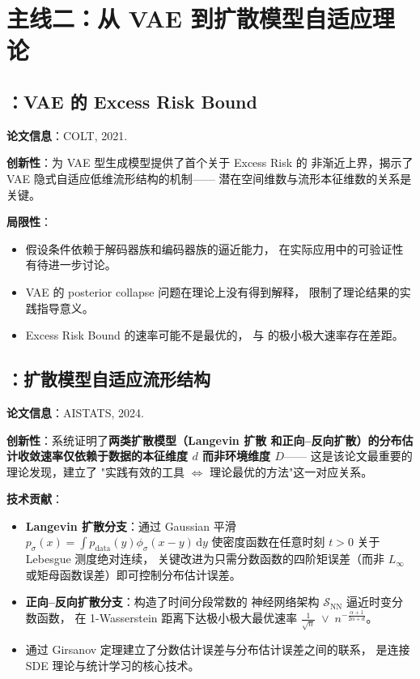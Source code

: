\section{主线二：从 VAE 到扩散模型自适应理论}\label{sec:line2}

\subsection{\citep{tang2021vae}：VAE 的 Excess Risk Bound}\label{sec:ch0-colt2021}

\textbf{论文信息}：COLT, 2021.

\textbf{创新性}：为 VAE 型生成模型提供了首个关于 Excess Risk 的
非渐近上界，揭示了 VAE 隐式自适应低维流形结构的机制——
潜在空间维数与流形本征维数的关系是关键。

\textbf{局限性}：

\begin{itemize}
    \item 假设条件依赖于解码器族和编码器族的逼近能力，
          在实际应用中的可验证性有待进一步讨论。
    \item VAE 的 posterior collapse 问题在理论上没有得到解释，
          限制了理论结果的实践指导意义。
    \item Excess Risk Bound 的速率可能不是最优的，
          与 \citep{tang2022minimax} 的极小极大速率存在差距。
\end{itemize}

\subsection{\citep{tang2024diffusion}：扩散模型自适应流形结构}\label{sec:ch0-aistats2024}

\textbf{论文信息}：AISTATS, 2024.

\textbf{创新性}：系统证明了\textbf{两类扩散模型（Langevin 扩散
和正向--反向扩散）的分布估计收敛速率仅依赖于数据的本征维度 $d$
而非环境维度 $D$}——
这是该论文最重要的理论发现，建立了
"实践有效的工具 $\Leftrightarrow$ 理论最优的方法"这一对应关系。

\textbf{技术贡献}：

\begin{itemize}
    \item \textbf{Langevin 扩散分支}：通过 Gaussian 平滑
          $p_\sigma(x) = \int p_{\mathrm{data}}(y)\phi_\sigma(x-y)\,\mathrm{d}y$
          使密度函数在任意时刻 $t>0$ 关于 Lebesgue 测度绝对连续，
          关键改进为只需分数函数的四阶矩误差（而非 $L_\infty$
          或矩母函数误差）即可控制分布估计误差。
    \item \textbf{正向--反向扩散分支}：构造了时间分段常数的
          神经网络架构 $\mathcal{S}_{\mathrm{NN}}$ 逼近时变分数函数，
          在 1-Wasserstein 距离下达极小极大最优速率
          $\frac{1}{\sqrt{n}}\;\vee\;n^{-\frac{\alpha+1}{2\alpha+d}}$。
    \item 通过 Girsanov 定理建立了分数估计误差与分布估计误差之间的联系，
          是连接 SDE 理论与统计学习的核心技术。
\end{itemize}

